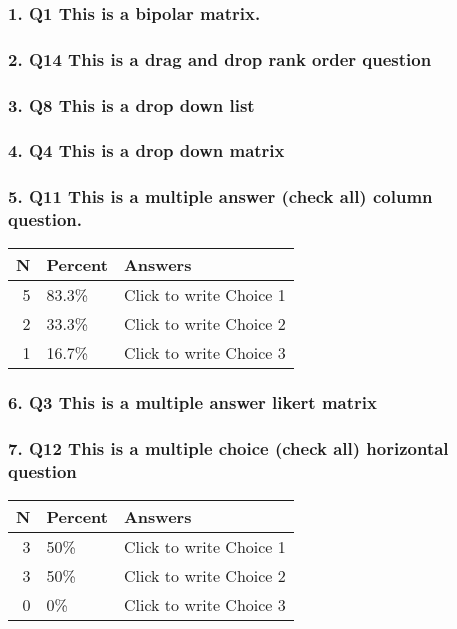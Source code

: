 \documentclass{article}\usepackage[]{graphicx}\usepackage[]{color}
\begin{document}
\subsubsection*{1. Q1
This is a bipolar matrix.}

\hfill \break \hfill \break
\subsubsection*{2. Q14
This is a drag and drop rank order question}

\hfill \break \hfill \break
\subsubsection*{3. Q8
This is a drop down list}

\hfill \break \hfill \break
\subsubsection*{4. Q4
This is a drop down matrix}

\hfill \break \hfill \break
\subsubsection*{5. Q11
This is a multiple answer (check all) column question.}

\begin{tabular}{r|l|l}
\hline
N & Percent & Answers\\
\hline
5 & 83.3\% & Click to write Choice 1\\
\hline
2 & 33.3\% & Click to write Choice 2\\
\hline
1 & 16.7\% & Click to write Choice 3\\
\hline
\end{tabular}


\hfill \break \hfill \break
\subsubsection*{6. Q3
This is a multiple answer likert matrix}

\hfill \break \hfill \break
\subsubsection*{7. Q12
This is a multiple choice (check all) horizontal question}

\begin{tabular}{r|l|l}
\hline
N & Percent & Answers\\
\hline
3 & 50\% & Click to write Choice 1\\
\hline
3 & 50\% & Click to write Choice 2\\
\hline
0 & 0\% & Click to write Choice 3\\
\hline
\end{tabular}
\end{document}
